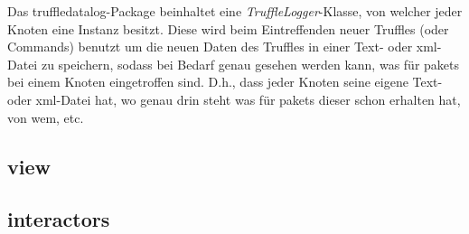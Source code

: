     \medskip
    Das truffledatalog-Package beinhaltet eine \textit{TruffleLogger}-Klasse, von
    welcher jeder Knoten eine Instanz besitzt. Diese wird beim Eintreffenden neuer Truffles
    (oder Commands) benutzt um die neuen Daten des Truffles in einer Text- oder xml-Datei zu speichern,
    sodass bei Bedarf genau gesehen werden kann, was für \glspl{paket} bei einem
    Knoten eingetroffen sind. D.h., dass jeder Knoten seine eigene Text- oder xml-Datei
    hat, wo genau drin steht was für \glspl{paket} dieser schon erhalten hat,
    von wem, etc.

\subsection{view}
\label{subsec:view}

\subsection{interactors}
\label{subsec:interactors}
